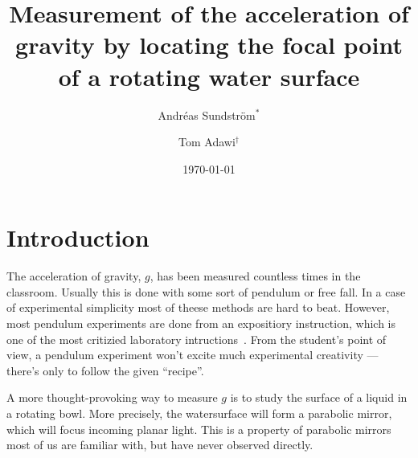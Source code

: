 \documentclass[11pt,towcolumn, swedish, english]{article}
\begin{document}
\title{Measurement of the acceleration of gravity by locating the
  focal point of a rotating water surface} 

\author{Andréas Sundström$^*$
\and Tom Adawi$^\dagger$
}
\date{\today}




\section{Introduction}
The acceleration of gravity, $g$, has been measured countless times in the
classroom. Usually this is done with some sort of pendulum or free fall. In a
case of experimental simplicity most of theese methods are hard to beat. 
However, most pendulum experiments are done from an expositiory
instruction, which is one of the most critizied laboratory
intructions~\cite{Domin1999}. From the student's point of view, a pendulum experiment
won't excite much experimental creativity --- there's only to follow the
given ``recipe''. 

A more thought-provoking way to measure $g$ is to study the surface of
a liquid in a rotating bowl. More precisely, the watersurface will
form a parabolic mirror, which will focus incoming planar light. This
is a property of parabolic mirrors most of us are familiar with, but
have never observed directly. 
\end{document}

